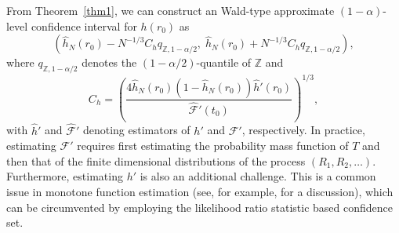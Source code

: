 \documentclass[12pt]{amsart}
\theoremstyle{plain}
\theoremstyle{remark}
\numberwithin{equation}{section}
\begin{document}
From Theorem~\ref{thm1}, we can construct an Wald-type approximate \((1-\alpha)\)-level confidence interval for 
\(h(r_{0})\) as
\[
\left( \hat{h}_{N}(r_{0}) - N^{-1/3} C_{h}q_{\mathbb{Z},1-\alpha/2},\;
       \hat{h}_{N}(r_{0}) + N^{-1/3} C_{h}q_{\mathbb{Z},1-\alpha/2} \right),
\]
where \(q_{\mathbb{Z},1-\alpha/2}\) denotes the \((1-\alpha/2)\)-quantile of \(\mathbb{Z}\) 
and
\[
C_{h} = 
\left( \frac{4\hat{h}_{N}(r_{0})(1-\hat{h}_{N}(r_{0}))\hat{h}'(r_{0})}{\widehat{\mathcal{F}}'(t_{0})} \right)^{1/3},
\]
with \(\hat{h}'\) and \(\widehat{\mathcal{F}}'\) denoting estimators of \(h'\) and \(\mathcal{F}'\), respectively. 
In practice, estimating \(\mathcal{F}'\) requires first estimating the probability mass function of \(T\) 
and then that of the finite dimensional distributions of the process \((R_1, R_2, \ldots)\). 
Furthermore, estimating \(h'\) is also an additional challenge. 
This is a common issue in monotone function estimation (see, for example, \cite{banerjee2005confidence} 
for a discussion), which can be circumvented by employing the likelihood ratio statistic based confidence set.
\end{document}
